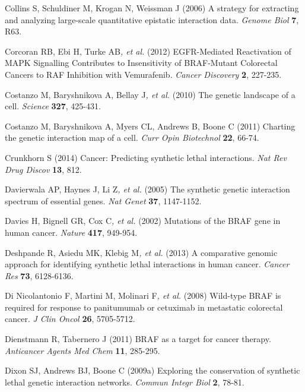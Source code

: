 Collins S, Schuldiner M, Krogan N, Weissman J (2006) A strategy for
extracting and analyzing large-scale quantitative epistatic interaction
data. \textit{Genome Biol} \textbf{7}, R63.



\hypertarget{ENREF24}{}Corcoran RB, Ebi H, Turke AB\textit{, et al.}
(2012) EGFR-Mediated Reactivation of MAPK Signalling Contributes to
Insensitivity of BRAF-Mutant Colorectal Cancers to RAF Inhibition with
Vemurafenib. \textit{Cancer Discovery} \textbf{2}, 227-235.



Costanzo M, Baryshnikova A, Bellay J\textit{, et al.} (2010) The genetic
landscape of a cell. \textit{Science} \textbf{327}, 425-431.



Costanzo M, Baryshnikova A, Myers CL, Andrews B, Boone C (2011) Charting
the genetic interaction map of a cell. \textit{Curr Opin Biotechnol}
\textbf{22}, 66-74.



\hypertarget{ENREF27}{}Crunkhorn S (2014) Cancer: Predicting synthetic
lethal interactions. \textit{Nat Rev Drug Discov} \textbf{13}, 812.



\hypertarget{ENREF28}{}Davierwala AP, Haynes J, Li Z\textit{, et al.}
(2005) The synthetic genetic interaction spectrum of essential genes.
\textit{Nat Genet} \textbf{37}, 1147-1152.



Davies H, Bignell GR, Cox C\textit{, et al.} (2002) Mutations of the
BRAF gene in human cancer. \textit{Nature} \textbf{417}, 949-954.



\hypertarget{ENREF30}{}Deshpande R, Asiedu MK, Klebig M\textit{, et al.}
(2013) A comparative genomic approach for identifying synthetic lethal
interactions in human cancer. \textit{Cancer Res} \textbf{73},
6128-6136.



Di Nicolantonio F, Martini M, Molinari F\textit{, et al.} (2008)
Wild-type BRAF is required for response to panitumumab or cetuximab in
metastatic colorectal cancer. \textit{J Clin Oncol} \textbf{26},
5705-5712.



Dienstmann R, Tabernero J (2011) BRAF as a target for cancer therapy.
\textit{Anticancer Agents Med Chem} \textbf{11}, 285-295.



Dixon SJ, Andrews BJ, Boone C (2009a) Exploring the conservation of
synthetic lethal genetic interaction networks. \textit{Commun Integr
Biol} \textbf{2}, 78-81.




